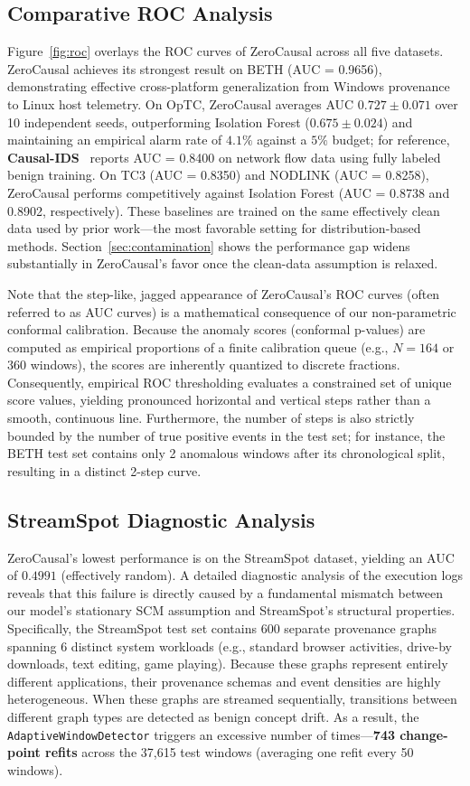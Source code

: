 \subsection{Comparative ROC Analysis}
\label{sec:roc}
Figure~\ref{fig:roc} overlays the ROC curves of ZeroCausal across all five datasets. ZeroCausal achieves its strongest result on BETH (AUC = 0.9656), demonstrating effective cross-platform generalization from Windows provenance to Linux host telemetry. On OpTC, ZeroCausal averages AUC $\mathbf{0.727 \pm 0.071}$ over 10 independent seeds, outperforming Isolation Forest ($0.675 \pm 0.024$) and maintaining an empirical alarm rate of $4.1\%$ against a $5\%$ budget; for reference, \textbf{Causal-IDS}~\cite{causalids2026} reports AUC = 0.8400 on network flow data using fully labeled benign training. On TC3 (AUC = 0.8350) and NODLINK (AUC = 0.8258), ZeroCausal performs competitively against Isolation Forest (AUC = 0.8738 and 0.8902, respectively). These baselines are trained on the same effectively clean data used by prior work---the most favorable setting for distribution-based methods. Section~\ref{sec:contamination} shows the performance gap widens substantially in ZeroCausal's favor once the clean-data assumption is relaxed.

Note that the step-like, jagged appearance of ZeroCausal's ROC curves (often referred to as AUC curves) is a mathematical consequence of our non-parametric conformal calibration. Because the anomaly scores (conformal p-values) are computed as empirical proportions of a finite calibration queue (e.g., $N=164$ or $360$ windows), the scores are inherently quantized to discrete fractions. Consequently, empirical ROC thresholding evaluates a constrained set of unique score values, yielding pronounced horizontal and vertical steps rather than a smooth, continuous line. Furthermore, the number of steps is also strictly bounded by the number of true positive events in the test set; for instance, the BETH test set contains only 2 anomalous windows after its chronological split, resulting in a distinct 2-step curve.

\subsection{StreamSpot Diagnostic Analysis}
ZeroCausal's lowest performance is on the StreamSpot dataset, yielding an AUC of $0.4991$ (effectively random). A detailed diagnostic analysis of the execution logs reveals that this failure is directly caused by a fundamental mismatch between our model's stationary SCM assumption and StreamSpot's structural properties. 
Specifically, the StreamSpot test set contains 600 separate provenance graphs spanning 6 distinct system workloads (e.g., standard browser activities, drive-by downloads, text editing, game playing). Because these graphs represent entirely different applications, their provenance schemas and event densities are highly heterogeneous. 
When these graphs are streamed sequentially, transitions between different graph types are detected as benign concept drift. As a result, the \texttt{AdaptiveWindowDetector} triggers an excessive number of times---\textbf{743 change-point refits} across the 37,615 test windows (averaging one refit every 50 windows). 

